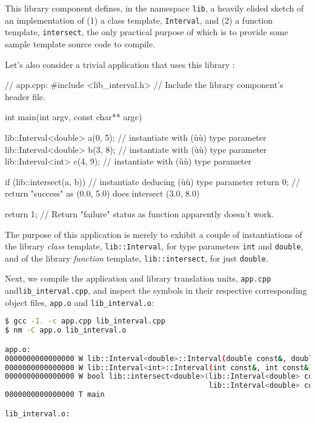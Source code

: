 \noindent This library component defines, in the namespace \lstinline!lib!, a heavily
elided sketch of an implementation of (1) a class template,
\lstinline!Interval!, and (2) a function template, \lstinline!intersect!, the
only practical purpose of which is to provide some sample template
source code to compile.

Let's also consider a trivial application that uses this library
:

\begin{emcppslisting}[emcppsbatch=e2]
// app.cpp:
#include <lib_interval.h>  // Include the library component's header file.

int main(int argv, const char** argc)
{
    lib::Interval<double> a(0, 5);  // instantiate with (ù{}ù) type parameter
    lib::Interval<double> b(3, 8);  // instantiate with (ù{}ù) type parameter
    lib::Interval<int>    c(4, 9);  // instantiate with (ù{}ù)    type parameter

    if (lib::intersect(a, b))  // instantiate deducing (ù{}ù) type parameter
    {
        return 0;  // return "success" as (0.0, 5.0) does intersect (3.0, 8.0)
    }

    return 1;  // Return "failure" status as function apparently doesn't work.
}
\end{emcppslisting}

\noindent The purpose of this application is merely to exhibit a couple of
instantiations of the library \emph{class} template,
\lstinline!lib::Interval!, for type parameters \lstinline!int! and
\lstinline!double!, and of the library \emph{function} template,
\lstinline!lib::intersect!, for just \lstinline!double!.

Next, we compile the application and library translation units,
\lstinline!app.cpp! and\linebreak[4]
\lstinline!lib_interval.cpp!, and inspect the symbols
in their respective corresponding object files, \lstinline!app.o! and
\lstinline!lib_interval.o!:

\begin{lstlisting}[language=bash]
$ gcc -I. -c app.cpp lib_interval.cpp
$ nm -C app.o lib_interval.o

app.o:
0000000000000000 W lib::Interval<double>::Interval(double const&, double const&)
0000000000000000 W lib::Interval<int>::Interval(int const&, int const&)
0000000000000000 W bool lib::intersect<double>(lib::Interval<double> const&,
                                               lib::Interval<double> const&)
0000000000000000 T main

lib_interval.o:
\end{lstlisting}

